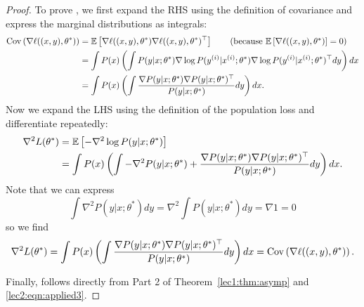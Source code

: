 \begin{proof}

To prove , we first expand the RHS using the definition of covariance and express the marginal distributions as integrals:
\begin{align}
    \Cov \left( \nabla \ell ((x, y), \theta^*) \right) &= \Exp \left[ \nabla \ell ((x, y), \theta^*) \nabla \ell ((x, y), \theta^*)^\top \right] \tag{because  $\Exp \left[ \nabla \ell ((x, y), \theta^*) \right] = 0$}\\
    &= \int P(x) \left( \int P(y \vert x; \theta^*) \nabla \log P( y\sp{i} \vert x\sp{i} ; \theta^*) \nabla \log P( y\sp{i} \vert x\sp{i} ; \theta^*)^\top dy \right) dx \\
    &= \int P(x) \left( \int \frac{\nabla P(y \vert x; \theta^*) \nabla P(y \vert x; \theta^*)^\top}{P(y \vert x; \theta^*)}dy \right) dx.
\end{align}
Now we expand the LHS using the definition of the population loss and differentiate repeatedly:
\begin{align}
    \nabla^2 L(\theta^*) &= \operatorname*{\mathbb{E}} \left[- \nabla^2 \log P(y \vert x; \theta^*) \right] \\
    &= \int P(x) \left( \int - \nabla^2 P(y \vert x; \theta^*) + \frac{\nabla P(y \vert x; \theta^*) \nabla P(y \vert x; \theta^*)^\top}{P(y \vert x; \theta^*)}dy  \right) dx.
\end{align}
Note that we can express 
\begin{equation} \int \nabla^2 P(y \vert x; \theta^*) dy = \nabla^2 \int P(y \vert x; \theta^*) dy = \nabla 1  = 0 \end{equation}
so we find
\begin{equation} \nabla^2 L(\theta^*) = \int P(x) \left( \int \frac{\nabla P(y \vert x; \theta^*) \nabla P(y \vert x; \theta^*)^\top}{P(y \vert x; \theta^*)}dy \right) dx = \operatorname{Cov} \left( \nabla \ell ((x, y), \theta^*) \right). \end{equation}

Finally,  follows directly from Part 2 of Theorem~\ref{lec1:thm:asymp} and \eqref{lec2:eqn:applied3}.
\end{proof}

